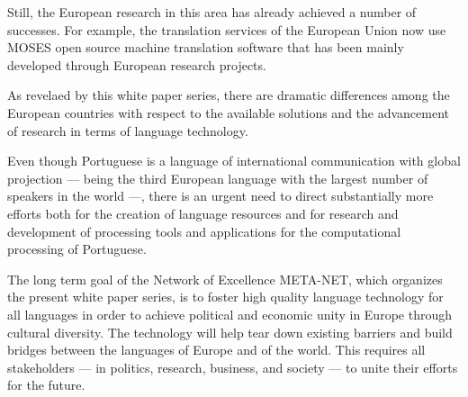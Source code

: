 \begin{multicols}{2}
Still, the European research in this area has already achieved a number of successes. For example, the translation services of the European Union now use MOSES open source machine translation software that has been mainly developed through European research projects.

As revelaed by this white paper series, there are dramatic differences among the European countries with respect
to the available solutions and the advancement of research in terms of language technology.

Even though Portuguese is a language of international communication with global projection ---
being the third European language with the largest number of speakers in the world ---,
there is an urgent need to direct substantially more efforts both for the creation of language resources 
and for research and development of processing tools and applications for the computational
processing of Portuguese.

The long term goal of the Network of Excellence META-NET, which organizes the present white paper  series, is to foster high quality language technology for all languages in order to achieve political and economic unity in Europe
through cultural diversity. The technology will help tear down existing barriers and build bridges between the languages
of Europe and of the world. This requires all stakeholders — in politics, research, business, and society — to unite their efforts for the future.

\end{multicols}

\clearpage


